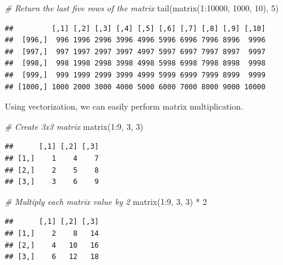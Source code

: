 \documentclass[
]{book}
\newenvironment{Shaded}{\begin{snugshade}}{\end{snugshade}}
\newcommand{\CommentTok}[1]{\textcolor[rgb]{0.56,0.35,0.01}{\textit{#1}}}
\newcommand{\DecValTok}[1]{\textcolor[rgb]{0.00,0.00,0.81}{#1}}
\newcommand{\FunctionTok}[1]{\textcolor[rgb]{0.00,0.00,0.00}{#1}}
\newcommand{\NormalTok}[1]{#1}
\newcommand{\SpecialCharTok}[1]{\textcolor[rgb]{0.00,0.00,0.00}{#1}}
\begin{document}
\begin{Shaded}
\begin{Highlighting}[]
\CommentTok{\# Return the last five rows of the matrix}
\FunctionTok{tail}\NormalTok{(}\FunctionTok{matrix}\NormalTok{(}\DecValTok{1}\SpecialCharTok{:}\DecValTok{10000}\NormalTok{, }\DecValTok{1000}\NormalTok{, }\DecValTok{10}\NormalTok{), }\DecValTok{5}\NormalTok{)}
\end{Highlighting}
\end{Shaded}

\begin{verbatim}
##         [,1] [,2] [,3] [,4] [,5] [,6] [,7] [,8] [,9] [,10]
##  [996,]  996 1996 2996 3996 4996 5996 6996 7996 8996  9996
##  [997,]  997 1997 2997 3997 4997 5997 6997 7997 8997  9997
##  [998,]  998 1998 2998 3998 4998 5998 6998 7998 8998  9998
##  [999,]  999 1999 2999 3999 4999 5999 6999 7999 8999  9999
## [1000,] 1000 2000 3000 4000 5000 6000 7000 8000 9000 10000
\end{verbatim}

Using vectorization, we can easily perform matrix multiplication.

\begin{Shaded}
\begin{Highlighting}[]
\CommentTok{\# Create 3x3 matrix}
\FunctionTok{matrix}\NormalTok{(}\DecValTok{1}\SpecialCharTok{:}\DecValTok{9}\NormalTok{, }\DecValTok{3}\NormalTok{, }\DecValTok{3}\NormalTok{)}
\end{Highlighting}
\end{Shaded}

\begin{verbatim}
##      [,1] [,2] [,3]
## [1,]    1    4    7
## [2,]    2    5    8
## [3,]    3    6    9
\end{verbatim}

\begin{Shaded}
\begin{Highlighting}[]
\CommentTok{\# Multiply each matrix value by 2}
\FunctionTok{matrix}\NormalTok{(}\DecValTok{1}\SpecialCharTok{:}\DecValTok{9}\NormalTok{, }\DecValTok{3}\NormalTok{, }\DecValTok{3}\NormalTok{) }\SpecialCharTok{*} \DecValTok{2}
\end{Highlighting}
\end{Shaded}

\begin{verbatim}
##      [,1] [,2] [,3]
## [1,]    2    8   14
## [2,]    4   10   16
## [3,]    6   12   18
\end{verbatim}
\end{document}
